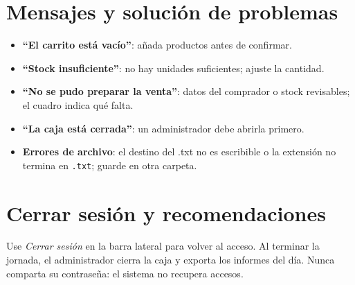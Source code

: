 \documentclass[12pt,a4paper]{report}
\begin{document}
\section{Mensajes y solución de problemas}
\begin{itemize}
\item \textbf{``El carrito está vacío''}: añada productos antes de confirmar.
\item \textbf{``Stock insuficiente''}: no hay unidades suficientes; ajuste la cantidad.
\item \textbf{``No se pudo preparar la venta''}: datos del comprador o stock revisables; el cuadro indica qué falta.
\item \textbf{``La caja está cerrada''}: un administrador debe abrirla primero.
\item \textbf{Errores de archivo}: el destino del .txt no es escribible o la extensión no termina en \texttt{.txt}; guarde en otra carpeta.
\end{itemize}

\section{Cerrar sesión y recomendaciones}
Use \emph{Cerrar sesión} en la barra lateral para volver al acceso. Al terminar la jornada, el administrador cierra la caja y exporta los informes del día. Nunca comparta su contraseña: el sistema no recupera accesos.
\end{document}

